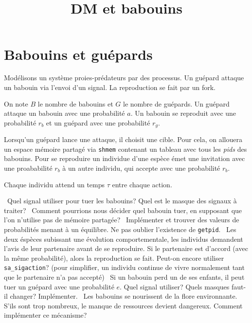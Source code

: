 \documentclass{exam}
\title{DM et babouins}
\author{}
\date{}
\begin{document}
\maketitle
\section{Babouins et gu\'epards}
Mod\'elisons un syst\`eme proies-pr\'edateurs par des processus.  Un gu\'epard
attaque un babouin via l'envoi d'un signal. La reproduction se fait par un
fork.

On note \( B \) le nombre de babouins et \( G \) le nombre de gu\'epards.
Un gu\'epard attaque un babouin avec une probabilit\'e \( a \). Un
babouin se reproduit avec une probabilit\'e \( r_b \) et un gu\'epard
avec une probabilit\'e \( r_g \).

Lorsqu'un gu\'epard lance une attaque, il choisit une cible. Pour cela, on
allouera un espace m\'emoire partag\'e via \texttt{shmem} contenant un tableau
avec tous les \textit{pids} des babouins. Pour se reproduire un individue d'une
esp\`ece \'emet une invitation avec une proababilit\'e \( r_b\) \`a un autre
individu, qui accepte avec une probabilit\'e \( r_b \).

Chaque individu attend un temps \( \tau \) entre chaque action.
\begin{questions}
  \question\
  Quel signal utiliser pour tuer les babouins? Quel est le masque des
  signaux \`a traiter?
  \question\
  Comment pourrions nous d\'ecider quel babouin tuer, en supposant que
  l'on n'utilise pas de m\'emoire partag\'ee?
  \question\
  Impl\'ementer et trouver des valeurs de probabilit\'es menant \`a un
  \'equilibre. Ne pas oublier l'existence de \texttt{getpid}.
  \question\
  Les deux \'esp\`eces subissant une \'evolution comportementale, les
  individus demandent l'avis de leur partenaire avant de se reproduire.
  Si le partenaire est d'accord (avec la m\^eme probabilit\'e), alors la
  reproduction se fait. Peut-on encore utiliser \texttt{sa\_sigaction}?
  (pour simplifier, un individu continue de vivre normalement tant que le
  partenaire n'a pas accept\'e)
  \question\
  Si un babouin perd un de ses enfants, il peut tuer un
  gu\'epard avec une probabilit\'e \( e \). Quel signal utiliser? Quels
  masques faut-il changer? Impl\'ementer.
  \question\
  Les babouins se nourissent de la flore environnante. S'ils sont trop
  nombreux, le manque de ressources devient dangereux. Comment
  impl\'ementer ce m\'ecanisme?
  \begin{solution}
    \inputminted{C}{baboons/main.c}
  \end{solution}
\end{questions}
\end{document}
